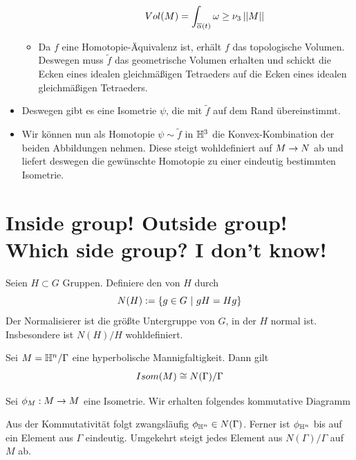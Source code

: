 \documentclass{book}
\begin{document}
\begin{itemize}
\begin{itemize}
\begin{itemize}
		\[ Vol(M) = \int_{\overline{\alpha}(t)}\omega  \geq \nu_3\left|\left|M\right|\right|  \]
	\end{itemize}
\item Da $f$ eine Homotopie-Äquivalenz ist, erhält $f$ das topologische Volumen. Deswegen muss $\widetilde{f}$ das geometrische Volumen erhalten und schickt die Ecken eines idealen gleichmäßigen Tetraeders auf die Ecken eines idealen gleichmäßigen Tetraeders.
\end{itemize}
\item Deswegen gibt es eine Isometrie $\psi$, die mit $\widetilde{f}$ auf dem Rand übereinstimmt.
\item Wir können nun als Homotopie $\psi \sim \widetilde{f}$ in $\mathbb{H}^3$ die Konvex-Kombination der beiden Abbildungen nehmen. Diese steigt wohldefiniert auf $M\overset{}{\rightarrow} N$ ab und liefert deswegen die gewünschte Homotopie zu einer eindeutig bestimmten Isometrie.
\end{itemize}
\newpage
\section{Inside group! Outside group! Which side group? I don't know!}
\Def{}
Seien $H\subset G$ Gruppen. Definiere den  von $H$ durch
\[ N(H) := \set{g \in G}{ gH = Hg } \]
Der Normalisierer ist die größte Untergruppe von $G$, in der $H$ normal ist. Insbesondere ist $N(H) /H$ wohldefiniert.

\Prop{}
Sei $M = \mathbb{H}^n / \Gamma$ eine hyperbolische Mannigfaltigkeit. Dann gilt
\[ Isom(M) \overset{}{\cong} N(\Gamma) / \Gamma \]
\begin{Beweis}{}
	Sei $\phi_M : M \overset{}{\rightarrow} M$ eine Isometrie. Wir erhalten folgendes kommutative Diagramm
		\begin{center}
	\end{center}
Aus der Kommutativität folgt zwangsläufig $\phi_{\mathbb{H}^n} \in N(\Gamma)$. Ferner ist $\phi_{\mathbb{H}^n}$ bis auf ein Element aus $\Gamma$ eindeutig. Umgekehrt steigt jedes Element aus $N(\Gamma)/\Gamma$ auf $M$ ab. 
\end{Beweis}
\end{document}
